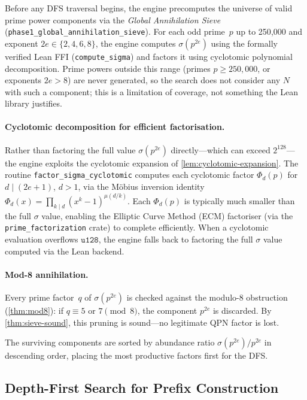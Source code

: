 Before any DFS traversal begins, the engine precomputes the universe of
valid prime power components via the \emph{Global Annihilation Sieve}
(\texttt{phase1\_\allowbreak{}global\_\allowbreak{}annihilation\_\allowbreak{}sieve}).
For each odd prime~$p$ up to 250{,}000 and exponent
$2e \in \{2, 4, 6, 8\}$, the engine computes $\sigma(p^{2e})$ using the
formally verified Lean FFI (\texttt{compute\_\allowbreak{}sigma}) and
factors it using cyclotomic polynomial decomposition.
Prime powers outside this range (primes $p \ge 250{,}000$, or
exponents $2e > 8$) are never generated, so the search does not
consider any $N$ with such a component; this is a limitation of
coverage, not something the Lean library justifies.

\paragraph{Cyclotomic decomposition for efficient factorisation.}
Rather than factoring the full value $\sigma(p^{2e})$ directly---which
can exceed $2^{128}$---the engine exploits the cyclotomic expansion of
\cref{lem:cyclotomic-expansion}.  The routine
\texttt{factor\_\allowbreak{}sigma\_\allowbreak{}cyclotomic} computes
each cyclotomic factor $\Phi_d(p)$ for $d \mid (2e+1)$, $d > 1$, via
the M\"obius inversion identity
$\Phi_d(x) = \prod_{k \mid d} (x^k - 1)^{\mu(d/k)}$.  Each
$\Phi_d(p)$ is typically much smaller than the full $\sigma$ value,
enabling the Elliptic Curve Method (ECM) factoriser (via the
\texttt{prime\_\allowbreak{}factorization} crate) to complete
efficiently.  When a cyclotomic evaluation overflows $\mathtt{u128}$,
the engine falls back to factoring the full $\sigma$ value computed via
the Lean backend.

\paragraph{Mod-8 annihilation.}
Every prime factor~$q$ of $\sigma(p^{2e})$ is checked against the
modulo-8 obstruction (\cref{thm:mod8}): if $q \equiv 5$ or
$7 \pmod 8$, the component $p^{2e}$ is discarded.  By
\cref{thm:sieve-sound}, this pruning is sound---no legitimate QPN
factor is lost.

The surviving components are sorted by abundance ratio
$\sigma(p^{2e})/p^{2e}$ in descending order, placing the most
productive factors first for the DFS.

\subsection{Depth-First Search for Prefix Construction}
\label{subsec:dfs_prefix}

